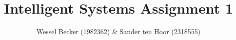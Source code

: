 \documentclass[10pt,a4paper]{article}
\begin{document}
\title{Intelligent Systems Assignment 1}

\author{Wessel Becker (1982362) \& Sander ten Hoor (2318555)}

\maketitle
\end{document}
